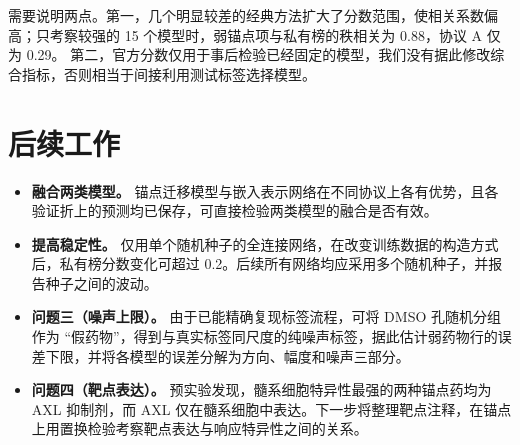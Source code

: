 \documentclass[11pt,a4paper]{article}
\begin{document}
需要说明两点。第一，几个明显较差的经典方法扩大了分数范围，使相关系数偏高；只考察较强的 15 个模型时，弱锚点项与私有榜的秩相关为 0.88，协议 A 仅为 0.29。
第二，官方分数仅用于事后检验已经固定的模型，我们没有据此修改综合指标，否则相当于间接利用测试标签选择模型。

\section{后续工作}

\begin{itemize}
\item \textbf{融合两类模型。} 锚点迁移模型与嵌入表示网络在不同协议上各有优势，且各验证折上的预测均已保存，可直接检验两类模型的融合是否有效。
\item \textbf{提高稳定性。} 仅用单个随机种子的全连接网络，在改变训练数据的构造方式后，私有榜分数变化可超过 0.2。后续所有网络均应采用多个随机种子，并报告种子之间的波动。
\item \textbf{问题三（噪声上限）。} 由于已能精确复现标签流程，可将 DMSO 孔随机分组作为 ``假药物''，得到与真实标签同尺度的纯噪声标签，据此估计弱药物行的误差下限，并将各模型的误差分解为方向、幅度和噪声三部分。
\item \textbf{问题四（靶点表达）。} 预实验发现，髓系细胞特异性最强的两种锚点药均为 AXL 抑制剂，而 AXL 仅在髓系细胞中表达。下一步将整理靶点注释，在锚点上用置换检验考察靶点表达与响应特异性之间的关系。
\end{itemize}
\end{document}
